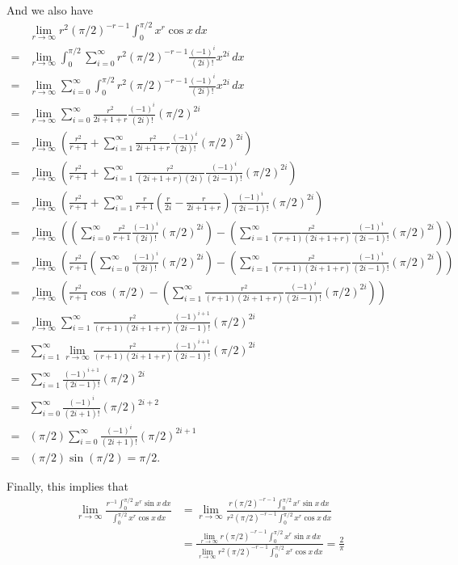 \begin{sol}{}{}
	And we also have
	\begin{align*}
		&\lim_{r\to \infty}
		r^2(\pi/2)^{-r-1} \int_0^{\pi/2} x^r \cos x\,dx\\
		=& \lim_{r\to \infty}
		\int_0^{\pi/2} \sum_{i=0}^\infty r^2(\pi/2)^{-r-1} \frac{(-1)^i}{(2i)!} x^{2i}\,dx \\
		=& \lim_{r\to \infty}
		\sum_{i=0}^\infty \int_0^{\pi/2} r^2(\pi/2)^{-r-1} \frac{(-1)^i}{(2i)!} x^{2i}\,dx \\
		=& \lim_{r\to \infty}
		\sum_{i=0}^\infty \frac{r^2}{2i+1+r}\frac{(-1)^i}{(2i)!} (\pi/2)^{2i} \\
		=& \lim_{r\to \infty} \left(
			\frac{r^2}{r+1} + \sum_{i=1}^\infty \frac{r^2}{2i+1+r}\frac{(-1)^i}{(2i)!} (\pi/2)^{2i}
		\right) \\
		=& \lim_{r\to \infty} \left(
			\frac{r^2}{r+1} + \sum_{i=1}^\infty \frac{r^2}{(2i+1+r)(2i)}\frac{(-1)^i}{(2i-1)!} (\pi/2)^{2i}
		\right) \\
		=& \lim_{r\to \infty} \left(
			\frac{r^2}{r+1} + \sum_{i=1}^\infty \frac{r}{r+1}\left(\frac{r}{2i} - \frac{r}{2i+1+r}\right)\frac{(-1)^i}{(2i-1)!} (\pi/2)^{2i}
		\right) \\
		=& \lim_{r\to \infty} \left(
			\left(\sum_{i=0}^\infty \frac{r^2}{r+1}\frac{(-1)^i}{(2i)!} (\pi/2)^{2i}\right) - 
			\left(\sum_{i=1}^\infty \frac{r^2}{(r+1)(2i+1+r)}\frac{(-1)^i}{(2i-1)!} (\pi/2)^{2i}\right)
		\right) \\
		=& \lim_{r\to \infty} \left(
			\frac{r^2}{r+1}\left(\sum_{i=0}^\infty \frac{(-1)^i}{(2i)!} (\pi/2)^{2i}\right) - 
			\left(\sum_{i=1}^\infty \frac{r^2}{(r+1)(2i+1+r)}\frac{(-1)^i}{(2i-1)!} (\pi/2)^{2i}\right)
		\right) \\
		=& \lim_{r\to \infty} \left(
			\frac{r^2}{r+1}\cos(\pi/2) - 
			\left(\sum_{i=1}^\infty \frac{r^2}{(r+1)(2i+1+r)}\frac{(-1)^i}{(2i-1)!} (\pi/2)^{2i}\right) 
		\right) \\
		=& \lim_{r\to \infty}
		\sum_{i=1}^\infty \frac{r^2}{(r+1)(2i+1+r)}\frac{(-1)^{i+1}}{(2i-1)!} (\pi/2)^{2i} \\
		=& \sum_{i=1}^\infty \lim_{r\to \infty} \frac{r^2}{(r+1)(2i+1+r)}\frac{(-1)^{i+1}}{(2i-1)!} (\pi/2)^{2i} \\
		=& \sum_{i=1}^\infty \frac{(-1)^{i+1}}{(2i-1)!} (\pi/2)^{2i} \\
		=& \sum_{i=0}^\infty \frac{(-1)^{i}}{(2i+1)!} (\pi/2)^{2i+2} \\
		=& (\pi/2) \sum_{i=0}^\infty \frac{(-1)^{i}}{(2i+1)!} (\pi/2)^{2i+1} \\
		=& (\pi/2)\sin(\pi/2) = \pi/2.
	\end{align*}

	Finally, this implies that
	\begin{align*}
		\lim_{r\to \infty}
		\frac%
		{r^{-1} \int_0^{\pi/2} x^r \sin x\,dx}%
		{\int_0^{\pi/2} x^r \cos x\,dx}
		&=
		\lim_{r\to \infty}
		\frac%
		{r  (\pi/2)^{-r-1} \int_0^{\pi/2} x^r \sin x\,dx}%
		{r^2(\pi/2)^{-r-1} \int_0^{\pi/2} x^r \cos x\,dx}\\
		&=
		\frac%
		{\lim_{r\to \infty}r  (\pi/2)^{-r-1} \int_0^{\pi/2} x^r \sin x\,dx}%
		{\lim_{r\to \infty}r^2(\pi/2)^{-r-1} \int_0^{\pi/2} x^r \cos x\,dx}
		= \frac{2}{\pi}
	\end{align*}
\end{sol}
